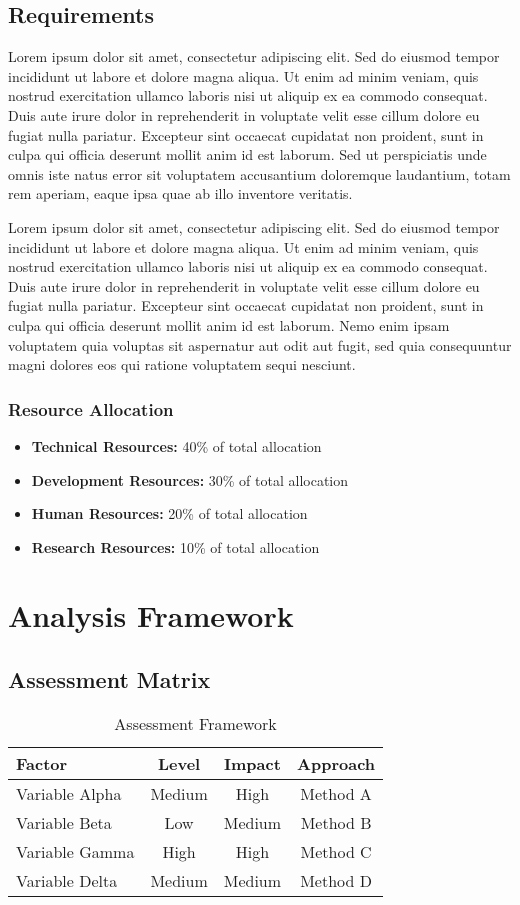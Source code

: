 \documentclass[11pt,a4paper]{article}
\newcommand{\loremtext}[1]{%
  Lorem ipsum dolor sit amet, consectetur adipiscing elit. Sed do eiusmod tempor incididunt ut labore et dolore magna aliqua. Ut enim ad minim veniam, quis nostrud exercitation ullamco laboris nisi ut aliquip ex ea commodo consequat. Duis aute irure dolor in reprehenderit in voluptate velit esse cillum dolore eu fugiat nulla pariatur. Excepteur sint occaecat cupidatat non proident, sunt in culpa qui officia deserunt mollit anim id est laborum.%
}
\begin{document}
\subsection{Requirements}

\loremtext{12} Sed ut perspiciatis unde omnis iste natus error sit voluptatem accusantium doloremque laudantium, totam rem aperiam, eaque ipsa quae ab illo inventore veritatis.

\loremtext{13} Nemo enim ipsam voluptatem quia voluptas sit aspernatur aut odit aut fugit, sed quia consequuntur magni dolores eos qui ratione voluptatem sequi nesciunt.

\subsubsection{Resource Allocation}
\begin{itemize}
  \item \textbf{Technical Resources:} 40\% of total allocation
  \item \textbf{Development Resources:} 30\% of total allocation
  \item \textbf{Human Resources:} 20\% of total allocation
  \item \textbf{Research Resources:} 10\% of total allocation
\end{itemize}

\section{Analysis Framework}

\subsection{Assessment Matrix}

\begin{table}[h]
\centering
\begin{tabular}{|l|c|c|c|}
\hline
\textbf{Factor} & \textbf{Level} & \textbf{Impact} & \textbf{Approach} \\
\hline
Variable Alpha & Medium & High & Method A \\
\hline
Variable Beta & Low & Medium & Method B \\
\hline
Variable Gamma & High & High & Method C \\
\hline
Variable Delta & Medium & Medium & Method D \\
\hline
\end{tabular}
\caption{Assessment Framework}
\end{table}
\end{document}
